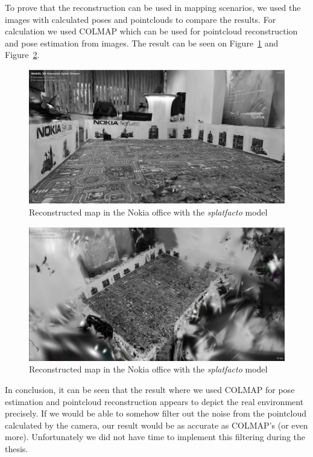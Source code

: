 To prove that the reconstruction can be used in mapping scenarios, we used the images with calculated poses and pointclouds to compare the results. For calculation we used COLMAP which can be used for pointcloud reconstruction and pose estimation from images. The result can be seen on Figure~\ref{fig:nokia_splatfacto_colmap_1} and Figure~\ref{fig:nokia_splatfacto_colmap_2}.
\begin{figure}[htbp]
	\centering
	\includegraphics[width=150mm, keepaspectratio]{figures_jpg/nokia_splatfacto_1.jpg}
	\caption{Reconstructed map in the Nokia office with the \textit{splatfacto} model}
	\label{fig:nokia_splatfacto_colmap_1}
\end{figure}

\begin{figure}[htbp]
	\centering
	\includegraphics[width=150mm, keepaspectratio]{figures_jpg/nokia_splatfacto_2.jpg}
	\caption{Reconstructed map in the Nokia office with the \textit{splatfacto} model}
	\label{fig:nokia_splatfacto_colmap_2}
\end{figure}

In conclusion, it can be seen that the result where we used COLMAP for pose estimation and pointcloud reconstruction appears to depict the real environment precisely. If we would be able to somehow filter out the noise from the pointcloud calculated by the camera, our result would be as accurate as COLMAP's (or even more). Unfortunately we did not have time to implement this filtering during the thesis.
